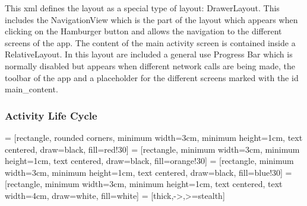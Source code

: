 This xml defines the layout as a special type of layout: DrawerLayout. This includes the NavigationView which is the part of the layout which appears when clicking on the Hamburger button and allows the navigation to the different screens of the app. The content of the main activity screen is contained inside a RelativeLayout. In this layout are included a general use Progress Bar which is normally disabled but appears when different network calls are being made, the toolbar of the app and a placeholder for the different screens marked with the id main\_content.

\subsubsection { Activity Life Cycle }

 = [rectangle, rounded corners, minimum width=3cm, 
minimum height=1cm, text centered, draw=black, fill=red!30]
 = [rectangle, minimum width=3cm, minimum height=1cm, text centered, draw=black, fill=orange!30]
 = [rectangle, minimum width=3cm, minimum height=1cm, text centered, draw=black, fill=blue!30]
 = [rectangle, minimum width=3cm, minimum height=1cm, text centered,
text width=4cm, draw=white, fill=white]
 = [thick,->,>=stealth]

